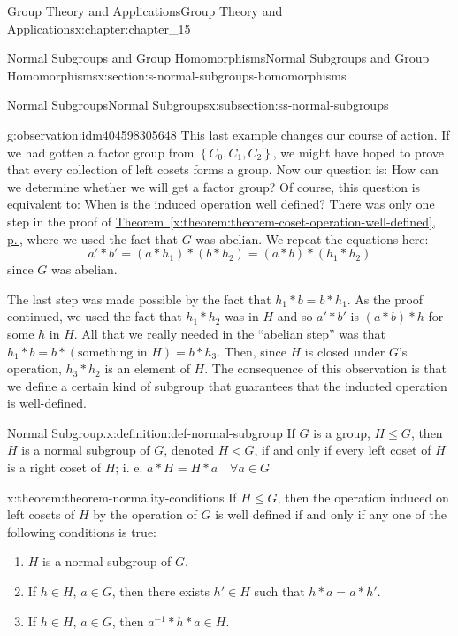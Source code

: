 \documentclass[twoside,10pt,]{book}
\newcommand{\xreffont}{\relax}
\numberwithin{equation}{section}
\begin{document}
\begin{chapterptx}{Group Theory and Applications}{}{Group Theory and Applications}{}{}{x:chapter:chapter_15}
\begin{sectionptx}{Normal Subgroups and Group Homomorphisms}{}{Normal Subgroups and Group Homomorphisms}{}{}{x:section:s-normal-subgroups-homomorphisms}
\begin{subsectionptx}{Normal Subgroups}{}{Normal Subgroups}{}{}{x:subsection:ss-normal-subgroups}
\begin{observation}{}{g:observation:idm404598305648}
This last example changes our course of action. If we had gotten a factor group from \(\left\{C_0,C_1,C_2\right\}\), we might have hoped to prove that every collection of left cosets forms a group. Now our question is: How can we determine whether we will get a factor group? Of course, this question is equivalent to: When is the induced operation well defined? There was only one step in the proof of \hyperref[x:theorem:theorem-coset-operation-well-defined]{Theorem~{\xreffont\ref{x:theorem:theorem-coset-operation-well-defined}}, p.\,\pageref{x:theorem:theorem-coset-operation-well-defined}}, where we used the fact that \(G\) was abelian. We repeat the equations here:%
\begin{equation*}
a'*b' = \left(a*h_1\right)*\left(b*h_2 \right) = (a*b)*\left(h_1*h_2\right)
\end{equation*}
since \(G\) was abelian.%
\par
The last step was made possible by the fact that \(h_1*b=b*h_1\). As the proof continued, we used the fact that \(h_1*h_2\) was in \(H\) and so \(a'*b'\) is \((a*b)*h\) for some \(h\) in \(H\). All that we really needed in the ``abelian step'' was that \(h_1*b = b*(\textrm{something in } H) = b*h_3\).  Then, since \(H\) is closed under \(G\)'s operation, \(h_3*h_2\) is an element of \(H\). The consequence of this observation is that we define a certain kind of subgroup that guarantees that the inducted operation is well-defined.%
\end{observation}
\begin{definition}{Normal Subgroup.}{x:definition:def-normal-subgroup}%
%
\label{g:notation:idm404598295840}%
If \(G\) is a group, \(H \leq  G\), then \(H\) is  a normal subgroup of  \(G\), denoted \(H \triangleleft  G\), if and only if every left coset  of \(H\) is a right coset of \(H\); i. e. \(a*H = H*a \quad \forall a \in G\)%
\end{definition}
\begin{theorem}{}{}{x:theorem:theorem-normality-conditions}%
If \(H \leq G\), then the operation induced on left cosets of \(H\) by the operation of \(G\) is well defined if and only if  any one of the following conditions is true:%
\begin{enumerate}[label=(\alph*)]
\item{}\(H\) is a normal subgroup of \(G\).%
\item{}If \(h \in  H\), \(a \in  G\), then there exists \(h' \in  H\) such that \(h*a = a*h'\).%
\item{}If \(h \in H\), \(a \in G\), then \(a^{-1}*h*a \in  H\).%

\end{enumerate}
\end{theorem}
\end{subsectionptx}
\end{sectionptx}
\end{chapterptx}
\end{document}
